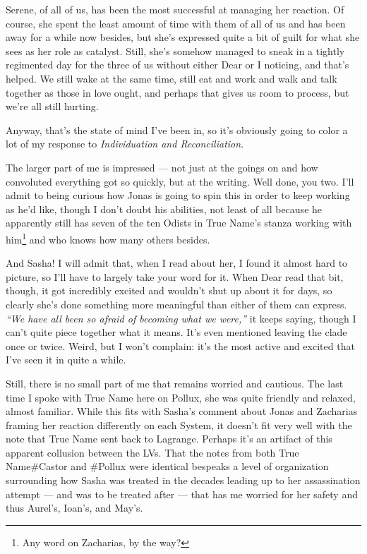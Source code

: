 Serene, of all of us, has been the most successful at managing her reaction. Of course, she spent the least amount of time with them of all of us and has been away for a while now besides, but she's expressed quite a bit of guilt for what she sees as her role as catalyst. Still, she's somehow managed to sneak in a tightly regimented day for the three of us without either Dear or I noticing, and that's helped. We still wake at the same time, still eat and work and walk and talk together as those in love ought, and perhaps that gives us room to process, but we're all still hurting.

Anyway, that's the state of mind I've been in, so it's obviously going to color a lot of my response to \emph{Individuation and Reconciliation}.

The larger part of me is impressed — not just at the goings on and how convoluted everything got so quickly, but at the writing. Well done, you two. I'll admit to being curious how Jonas is going to spin this in order to keep working as he'd like, though I don't doubt his abilities, not least of all because he apparently still has seven of the ten Odists in True Name's stanza working with him\footnote{Any word on Zacharias, by the way?} and who knows how many others besides.

And Sasha! I will admit that, when I read about her, I found it almost hard to picture, so I'll have to largely take your word for it. When Dear read that bit, though, it got incredibly excited and wouldn't shut up about it for days, so clearly she's done something more meaningful than either of them can express. \emph{``We have all been so afraid of becoming what we were,''} it keeps saying, though I can't quite piece together what it means. It's even mentioned leaving the clade once or twice. Weird, but I won't complain: it's the most active and excited that I've seen it in quite a while.

Still, there is no small part of me that remains worried and cautious. The last time I spoke with True Name here on Pollux, she was quite friendly and relaxed, almost familiar. While this fits with Sasha's comment about Jonas and Zacharias framing her reaction differently on each System, it doesn't fit very well with the note that True Name sent back to Lagrange. Perhaps it's an artifact of this apparent collusion between the LVs. That the notes from both True Name\#Castor and \#Pollux were identical bespeaks a level of organization surrounding how Sasha was treated in the decades leading up to her assassination attempt — and was to be treated after — that has me worried for her safety and thus Aurel's, Ioan's, and May's.

